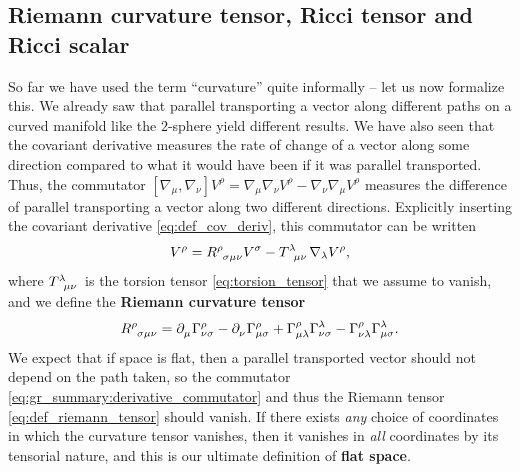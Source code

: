 \subsection{Riemann curvature tensor, Ricci tensor and Ricci scalar}


So far we have used the term ``curvature'' quite informally -- let us now formalize this.
We already saw that parallel transporting a vector along different paths on a curved manifold like the $2$-sphere yield different results.
We have also seen that the covariant derivative measures the rate of change of a vector along some direction compared to what it would have been if it was parallel transported.
Thus, the commutator $[ \nabla_\mu, \nabla_\nu ] V^\rho = \nabla_\mu \nabla_\nu V^\rho - \nabla_\nu \nabla_\mu V^\rho$ measures the difference of parallel transporting a vector along two different directions.
Explicitly inserting the covariant derivative \eqref{eq:def_cov_deriv}, this commutator can be written
\begin{equation}
	[ \nabla_\mu, \nabla_\nu ] V^\rho = R\indices{^\rho_{\sigma \mu \nu}} V^\sigma - T\indices{^\lambda_{\mu \nu}} \nabla_\lambda V^\rho ,
\label{eq:gr_summary:derivative_commutator}
\end{equation}
where $T\indices{^\lambda_{\mu \nu}}$ is the torsion tensor \eqref{eq:torsion_tensor} that we assume to vanish, and we define the \textbf{Riemann curvature tensor}
\begin{equation}
	R\indices{^\rho_\sigma_\mu_\nu} =
	\partial\indices{_\mu} \Gamma^\rho_{\nu \sigma} -
	\partial\indices{_\nu} \Gamma^{\rho}_{\mu \sigma} +
	\Gamma^\rho_{\mu \lambda} \Gamma^{\lambda}_{\nu \sigma} -
	\Gamma^\rho_{\nu \lambda} \Gamma^{\lambda}_{\mu \sigma} .
	\label{eq:def_riemann_tensor}
\end{equation}
We expect that if space is flat, then a parallel transported vector should not depend on the path taken, so the commutator \eqref{eq:gr_summary:derivative_commutator} and thus the Riemann tensor \eqref{eq:def_riemann_tensor} should vanish.
If there exists \emph{any} choice of coordinates in which the curvature tensor vanishes, then it vanishes in \emph{all} coordinates by its tensorial nature, and this is our ultimate definition of \textbf{flat space}.
